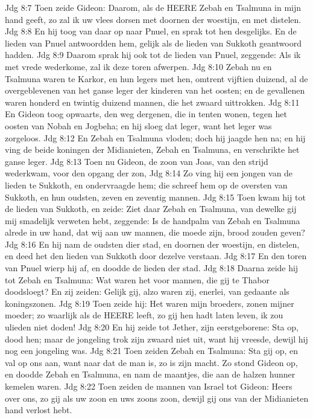 Jdg 8:7  Toen zeide Gideon: Daarom, als de HEERE Zebah en Tsalmuna in mijn hand geeft, zo zal ik uw vlees dorsen met doornen der woestijn, en met distelen.
Jdg 8:8  En hij toog van daar op naar Pnuel, en sprak tot hen desgelijks. En de lieden van Pnuel antwoordden hem, gelijk als de lieden van Sukkoth geantwoord hadden.
Jdg 8:9  Daarom sprak hij ook tot de lieden van Pnuel, zeggende: Als ik met vrede wederkome, zal ik deze toren afwerpen.
Jdg 8:10  Zebah nu en Tsalmuna waren te Karkor, en hun legers met hen, omtrent vijftien duizend, al de overgeblevenen van het ganse leger der kinderen van het oosten; en de gevallenen waren honderd en twintig duizend mannen, die het zwaard uittrokken.
Jdg 8:11  En Gideon toog opwaarts, den weg dergenen, die in tenten wonen, tegen het oosten van Nobah en Jogbeha; en hij sloeg dat leger, want het leger was zorgeloos.
Jdg 8:12  En Zebah en Tsalmuna vloden; doch hij jaagde hen na; en hij ving de beide koningen der Midianieten, Zebah en Tsalmuna, en verschrikte het ganse leger.
Jdg 8:13  Toen nu Gideon, de zoon van Joas, van den strijd wederkwam, voor den opgang der zon,
Jdg 8:14  Zo ving hij een jongen van de lieden te Sukkoth, en ondervraagde hem; die schreef hem op de oversten van Sukkoth, en hun oudsten, zeven en zeventig mannen.
Jdg 8:15  Toen kwam hij tot de lieden van Sukkoth, en zeide: Ziet daar Zebah en Tsalmuna, van dewelke gij mij smadelijk verweten hebt, zeggende: Is de handpalm van Zebah en Tsalmuna alrede in uw hand, dat wij aan uw mannen, die moede zijn, brood zouden geven?
Jdg 8:16  En hij nam de oudsten dier stad, en doornen der woestijn, en distelen, en deed het den lieden van Sukkoth door dezelve verstaan.
Jdg 8:17  En den toren van Pnuel wierp hij af, en doodde de lieden der stad.
Jdg 8:18  Daarna zeide hij tot Zebah en Tsalmuna: Wat waren het voor mannen, die gij te Thabor doodsloegt? En zij zeiden: Gelijk gij, alzo waren zij, enerlei, van gedaante als koningszonen.
Jdg 8:19  Toen zeide hij: Het waren mijn broeders, zonen mijner moeder; zo waarlijk als de HEERE leeft, zo gij hen hadt laten leven, ik zou ulieden niet doden!
Jdg 8:20  En hij zeide tot Jether, zijn eerstgeborene: Sta op, dood hen; maar de jongeling trok zijn zwaard niet uit, want hij vreesde, dewijl hij nog een jongeling was.
Jdg 8:21  Toen zeiden Zebah en Tsalmuna: Sta gij op, en val op ons aan, want naar dat de man is, zo is zijn macht. Zo stond Gideon op, en doodde Zebah en Tsalmuna, en nam de maantjes, die aan de halzen hunner kemelen waren.
Jdg 8:22  Toen zeiden de mannen van Israel tot Gideon: Heers over ons, zo gij als uw zoon en uws zoons zoon, dewijl gij ons van der Midianieten hand verlost hebt.

